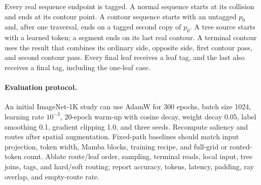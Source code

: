 Every real sequence endpoint is tagged. A normal sequence starts at its collision and ends at its contour point. A contour sequence starts with an untagged $p_0$ and, after one traversal, ends on a tagged second copy of $p_0$. A tree source starts with a learned token; a segment ends on its last real contour. A terminal contour uses the result that combines its ordinary side, opposite side, first contour pass, and second contour pass. Every final leaf receives a leaf tag, and the last also receives a final tag, including the one-leaf case.

\paragraph{Evaluation protocol.}
An initial ImageNet-1K study can use AdamW for 300 epochs, batch size 1024, learning rate $10^{-3}$, 20-epoch warm-up with cosine decay, weight decay 0.05, label smoothing 0.1, gradient clipping 1.0, and three seeds. Recompute saliency and routes after spatial augmentation. Fixed-path baselines should match input projection, token width, Mamba blocks, training recipe, and full-grid or routed-token count. Ablate route/leaf order, sampling, terminal reads, local input, tree joins, tags, and hard/soft routing; report accuracy, tokens, latency, padding, ray overlap, and empty-route rate.

\normalsize
